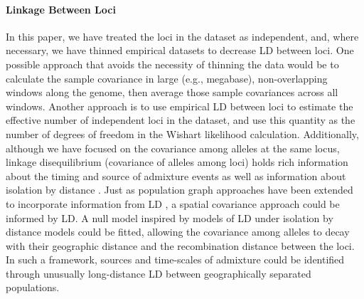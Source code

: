 \documentclass[10pt,letterpaper]{article}
\begin{document}
\paragraph{Linkage Between Loci}
In this paper, we have treated the loci in the dataset as independent, and,
where necessary, we have thinned empirical datasets to decrease LD between loci.
One possible approach that avoids the necessity of thinning the data would be to 
calculate the sample covariance in large (e.g., megabase), non-overlapping windows along the genome,
then average those sample covariances across all windows.
Another approach is to use empirical LD between loci to estimate the effective number of independent
loci in the dataset, and use this quantity as the number of degrees of freedom in the Wishart likelihood calculation.
Additionally, although we have focused on the covariance among alleles at the same locus, 
linkage disequilibrium (covariance of alleles among loci) 
holds rich information about the timing and source of admixture events \cite{chakraborty_admixture_1988,moorjani_india_2013, Hellenthal,gravel_population_2012} 
as well as information about isolation by distance \cite{ralph2013geography}.
Just as population graph approaches have been extended to incorporate information from LD \cite{Loh:13}, 
a spatial covariance approach could be informed by LD. 
A null model inspired by models of LD under isolation by distance models \cite{Arkendra2007,Barton2013} could be fitted, 
allowing the covariance among alleles to decay with their geographic distance and the recombination distance between the loci. 
In such a framework, sources and time-scales of admixture could be identified through unusually long-distance LD between geographically separated populations. 
\end{document}
